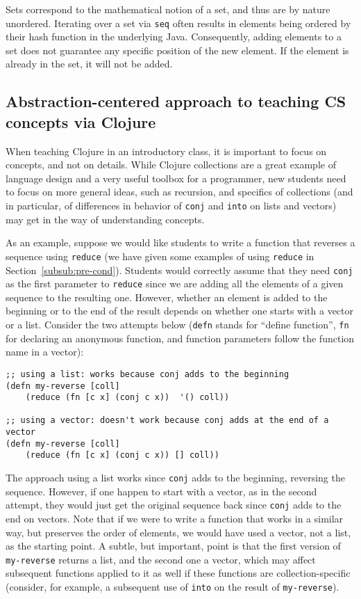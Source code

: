 \documentclass[submission,copyright,creativecommons]{eptcs}
\newcommand{\clocode}[1]{{\tt {#1}}}
\begin{document}
Sets correspond to the mathematical notion of a set, and thus are by nature unordered. Iterating over a set via \clocode{seq} often results in elements being ordered by their hash function in the underlying Java. Consequently, adding elements to a set does not guarantee any specific position of the new element. If the element is already in the set, it will not be added. 

\subsection{Abstraction-centered approach to teaching CS concepts via Clojure}\label{subsec:abstraction}
When teaching Clojure in an introductory class, it is important to focus on concepts, and not on details. While Clojure collections are a great example of language design and a very useful toolbox for a programmer, new students need to focus on more general ideas, such as recursion, and specifics of collections (and in particular, of differences in behavior of \clocode{conj} and \clocode{into} on lists and vectors) may get in the way of understanding concepts. 

As an example, suppose we would like students to write a function that reverses a sequence using \clocode{reduce} (we have given some examples of using \clocode{reduce} in Section~\ref{subsub:pre-cond}). Students would correctly assume that they need \clocode{conj} as the first parameter to \clocode{reduce} since we are adding all the elements of a given sequence to the resulting one. However, whether an element is added to the beginning or to the end of the result depends on whether one starts with a vector or a list. Consider the two attempts below (\clocode{defn} stands for ``define function'', \clocode{fn} for declaring an anonymous function, and function parameters follow the function name in a vector):
\begin{verbatim}
;; using a list: works because conj adds to the beginning
(defn my-reverse [coll]
    (reduce (fn [c x] (conj c x))  '() coll)) 

;; using a vector: doesn't work because conj adds at the end of a vector
(defn my-reverse [coll]
    (reduce (fn [c x] (conj c x)) [] coll)) 
\end{verbatim}
The approach using a list works since \clocode{conj} adds to the beginning, reversing the sequence. However, if one happen to start with a vector, as in the second attempt, they would just get the original sequence back since \clocode{conj} adds to the end on vectors. Note that if we were to write a function that works in a similar way, but preserves the order of elements, we would have used a vector, not a list, as the starting point. A subtle, but important, point is that the first version of \clocode{my-reverse} returns a list, and the second one a vector, which may affect subsequent functions applied to it as well if these functions are collection-specific (consider, for example, a subsequent use of \clocode{into} on the result of \clocode{my-reverse}). 
\end{document}

